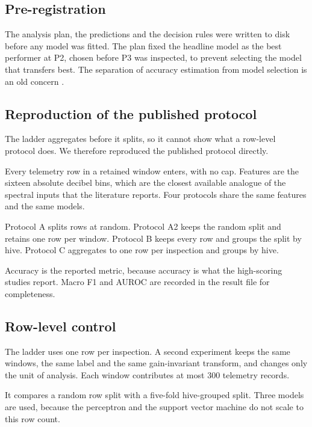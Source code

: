 ﻿\documentclass[review,12pt]{elsarticle}
\begin{document}
\subsection{Pre-registration}

The analysis plan, the predictions and the decision rules were written to disk
before any model was fitted.
The plan fixed the headline model as the best performer at P2, chosen before
P3 was inspected, to prevent selecting the model that transfers best.
The separation of accuracy estimation from model selection is an old concern
\cite{kohavi1995study}.

\subsection{Reproduction of the published protocol}
\label{sec:repro-method}

The ladder aggregates before it splits, so it cannot show what a row-level
protocol does.
We therefore reproduced the published protocol directly.

Every telemetry row in a retained window enters, with no cap.
Features are the sixteen absolute decibel bins, which are the closest available
analogue of the spectral inputs that the literature reports.
Four protocols share the same features and the same models.

Protocol A splits rows at random.
Protocol A2 keeps the random split and retains one row per window.
Protocol B keeps every row and groups the split by hive.
Protocol C aggregates to one row per inspection and groups by hive.

Accuracy is the reported metric, because accuracy is what the high-scoring
studies report.
Macro F1 and AUROC are recorded in the result file for completeness.

\subsection{Row-level control}
\label{sec:rowlevel-method}

The ladder uses one row per inspection.
A second experiment keeps the same windows, the same label and the same
gain-invariant transform, and changes only the unit of analysis.
Each window contributes at most 300 telemetry records.

It compares a random row split with a five-fold hive-grouped split.
Three models are used, because the perceptron and the support vector machine do
not scale to this row count.
\end{document}
